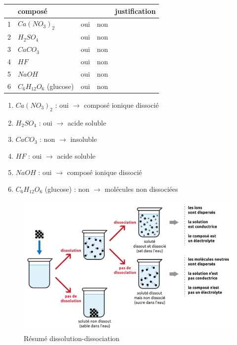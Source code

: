 \documentclass[
  11pt,
  french,
  a4paper,
  openany]{book}
\begin{document}
\begin{longtable}[]{@{}llccl@{}}
\toprule
& composé & & & justification\tabularnewline
\midrule
\endhead
1 & \(Ca(NO_3)_2\) & oui & non &\tabularnewline
2 & \(H_2SO_4\) & oui & non &\tabularnewline
3 & \(CaCO_3\) & oui & non &\tabularnewline
4 & \(HF\) & oui & non &\tabularnewline
5 & \(NaOH\) & oui & non &\tabularnewline
6 & \(C_6H_{12}O_6\) (glucose) & oui & non &\tabularnewline
\bottomrule
\end{longtable}

\begin{Answer}

\begin{enumerate}
\def\labelenumi{\arabic{enumi}.}
\item
  \(Ca(NO_3)_2\) : oui \(\rightarrow\) composé ionique dissocié
\item
  \(H_2SO_4\) : oui \(\rightarrow\) acide soluble
\item
  \(CaCO_3\) : non \(\rightarrow\) insoluble
\item
  \(HF\) : oui \(\rightarrow\) acide soluble
\item
  \(NaOH\) : oui \(\rightarrow\) composé ionique dissocié
\item
  \(C_6H_{12}O_6\) (glucose) : non \(\rightarrow\) molécules non dissociées
\end{enumerate}


\end{Answer}


\begin{figure}

{\centering \includegraphics[width=1\linewidth]{images/dissociation-resume} 

}

\caption{Résumé dissolution-dissociation}\label{fig:dissociation-resume}
\end{figure}
\end{document}
